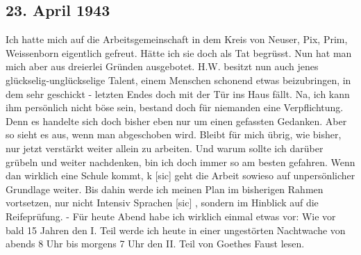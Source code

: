 \subsection{23. April 1943}

Ich hatte mich auf die Arbeitsgemeinschaft in dem Kreis von Neuser, Pix, Prim, Weissenborn eigentlich gefreut.
H\"{a}tte ich sie doch als Tat begr\"{u}sst.
Nun hat man mich aber aus dreierlei Gr\"{u}nden ausgebotet.
H.W. besitzt nun auch jenes gl\"{u}ckselig-ungl\"{u}ckselige Talent, einem Menschen schonend etwas beizubringen, in dem sehr geschickt - letzten Endes doch mit der T\"{u}r ins Haus f\"{a}llt.
Na, ich kann ihm pers\"{o}nlich nicht b\"{o}se sein, bestand doch f\"{u}r niemanden eine Verpflichtung.
Denn es handelte sich doch bisher eben nur um einen gefassten Gedanken.
Aber so sieht es aus, wenn man abgeschoben wird.
Bleibt f\"{u}r mich \"{u}brig, wie bisher, nur jetzt verst\"{a}rkt weiter allein zu arbeiten.
Und warum sollte ich dar\"{u}ber gr\"{u}beln und weiter nachdenken, bin ich doch immer so am besten gefahren.
Wenn dan wirklich eine Schule kommt, k{\color{red} [sic] } geht die Arbeit sowieso auf unpers\"{o}nlicher Grundlage weiter.
Bis dahin werde ich meinen Plan im bisherigen Rahmen vortsetzen, nur nicht Intensiv Sprachen{\color{red} [sic] }, sondern im Hinblick auf die Reifepr\"{u}fung.
- F\"{u}r heute Abend habe ich wirklich einmal etwas vor: Wie vor bald 15 Jahren den I. Teil werde ich heute in einer ungest\"{o}rten Nachtwache von abends 8 Uhr bis morgens 7 Uhr den II. Teil von Goethes Faust lesen.

\clearpage
